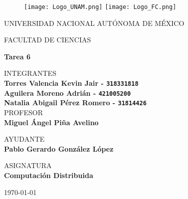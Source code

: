 \thispagestyle{empty}

\begin{figure}[ht]
  \texttt{[image: Logo\_UNAM.png]}
  \label{EscudoUNAM}
  \endminipage
  \texttt{[image: Logo\_FC.png]}
  \label{EscudoFC}
  \endminipage
\end{figure}

\begin{center}
  \vspace{0.8cm}
  \LARGE
  UNIVERSIDAD NACIONAL AUTÓNOMA DE MÉXICO

  \vspace{0.7cm}
  \LARGE
  FACULTAD DE CIENCIAS

  \vspace{0.8 cm}
  \Large
  \textbf{Tarea 6}

  \vspace{0.8 cm}
  \normalsize
  INTEGRANTES \\
  \vspace{.2cm}
  \large
  \textbf{Torres Valencia Kevin Jair - \texttt{318331818}}\\
  \textbf{Aguilera Moreno Adrián - \texttt{421005200}}\\
  \textbf{Natalia Abigail Pérez Romero  - \texttt{31814426}}\\

  \vspace{1 cm}
  \normalsize
  PROFESOR \\
  \vspace{.2cm}
  \large
  \textbf{Miguel Ángel Piña Avelino}

  \vspace{1 cm}
  AYUDANTE \\
  \vspace{.2cm}
  \large
  \textbf{Pablo Gerardo González López}
  \vspace{1.3cm}

  \normalsize
  ASIGNATURA \\
  \vspace{.2cm}
  \large
  \textbf{Computación Distribuida}

  \vspace{1 cm}
  \today
\end{center}

